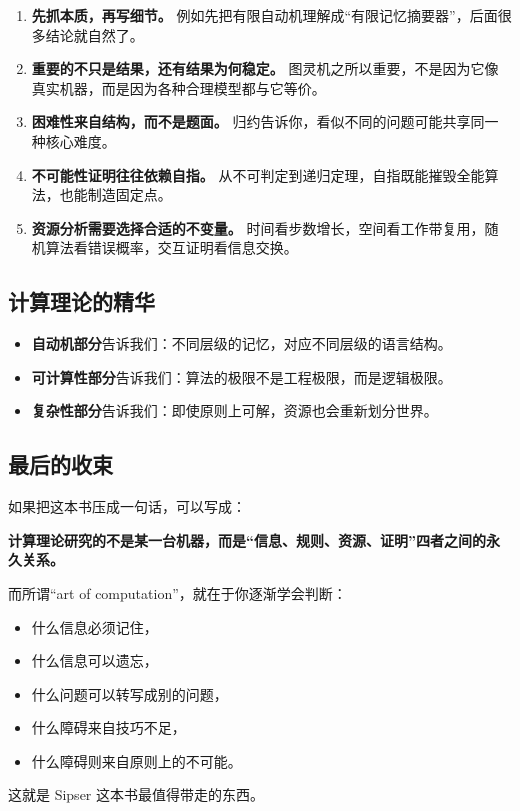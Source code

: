 \begin{enumerate}[leftmargin=2em]
  \item \textbf{先抓本质，再写细节。} 例如先把有限自动机理解成“有限记忆摘要器”，后面很多结论就自然了。
  \item \textbf{重要的不只是结果，还有结果为何稳定。} 图灵机之所以重要，不是因为它像真实机器，而是因为各种合理模型都与它等价。
  \item \textbf{困难性来自结构，而不是题面。} 归约告诉你，看似不同的问题可能共享同一种核心难度。
  \item \textbf{不可能性证明往往依赖自指。} 从不可判定到递归定理，自指既能摧毁全能算法，也能制造固定点。
  \item \textbf{资源分析需要选择合适的不变量。} 时间看步数增长，空间看工作带复用，随机算法看错误概率，交互证明看信息交换。
\end{enumerate}

\subsection{计算理论的精华}

\begin{itemize}[leftmargin=2em]
  \item \textbf{自动机部分}告诉我们：不同层级的记忆，对应不同层级的语言结构。
  \item \textbf{可计算性部分}告诉我们：算法的极限不是工程极限，而是逻辑极限。
  \item \textbf{复杂性部分}告诉我们：即使原则上可解，资源也会重新划分世界。
\end{itemize}

\subsection{最后的收束}

如果把这本书压成一句话，可以写成：

\begin{center}
\textbf{计算理论研究的不是某一台机器，而是“信息、规则、资源、证明”四者之间的永久关系。}
\end{center}

而所谓“art of computation”，就在于你逐渐学会判断：
\begin{itemize}[leftmargin=2em]
  \item 什么信息必须记住，
  \item 什么信息可以遗忘，
  \item 什么问题可以转写成别的问题，
  \item 什么障碍来自技巧不足，
  \item 什么障碍则来自原则上的不可能。
\end{itemize}

这就是 Sipser 这本书最值得带走的东西。
